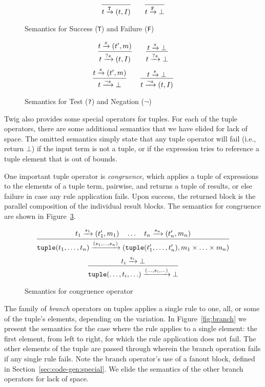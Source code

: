 \begin{figure}[ht]
\[
\infer
  {t \arr{\mathtt{T}} (t,I)}
  {}
\qquad
\infer
  {t \arr{\mathtt{F}} \bot}
  {}
\]
\caption{Semantics for Success (\texttt{T}) and Failure (\texttt{F})}
\label{fig:basic1}
\end{figure}

\begin{figure}[ht]
\[
\infer
  {t \arr{?s} (t,I)}
  {t \arr{s} (t',m)}
\qquad 
\infer
  {t \arr{?s} \bot}
  {t \arr{s} \bot}
\]
\[
\infer
  {t \arr{\lnot s} \bot}
  {t \arr{s} (t',m)}
\qquad 
\infer
  {t \arr{\lnot s} (t,I)}
  {t \arr{s} \bot}
\]
\caption{Semantics for Test (\texttt{?}) and Negation ($\lnot$)}
\label{fig:basic2}
\end{figure}

Twig also provides some special operators for tuples. For each of the tuple operators, there are some additional semantics that we have elided for lack of space. The omitted semantics simply state that any tuple operator will fail (i.e., return $\bot$) if the input term is not a tuple, or if the expression tries to reference a tuple element that is out of bounds.


One important tuple operator is \emph{congruence}, which applies a tuple of expressions to the elements of a tuple term, pairwise, and returns a tuple of results, or else failure in case any rule application fails. Upon success, the returned block is the parallel composition of the individual result blocks. The semantics for congruence are shown in Figure~\ref{fig:congruence}.

\begin{figure}[ht]
\[
\infer
  {\mathtt{tuple}(t_1,\ldots,t_n)\arr{(s_1,\ldots,s_n)} (\mathtt{tuple}(t_1',\ldots,t_n'),m_1 \times \ldots \times m_n)}
  {t_1 \arr{s_1} (t_1',m_1) \quad \ldots \quad t_n \arr{s_n} (t_n',m_n)}
\]
\[
\infer
  {\mathtt{tuple}(\ldots,t_i,\ldots)\arr{(\ldots,s_i,\ldots)}\bot}
  {t_i \arr{s_i} \bot}
\]
\caption{Semantics for congruence operator}
\label{fig:congruence}
\end{figure}

The family of \emph{branch} operators on tuples applies a single rule to one, all, or some of the tuple's elements, depending on the variation. In Figure~\ref{fig:branch} we present the semantics for the case where the rule applies to a single element: the first element, from left to right, for which the rule application does not fail. The other elements of the tuple are passed through wherein the branch operation fails if any single rule fails. Note the branch operator's use of a fanout block, defined in Section~\ref{sec:code-gen:special}. We elide the semantics of the other branch operators for lack of space.

